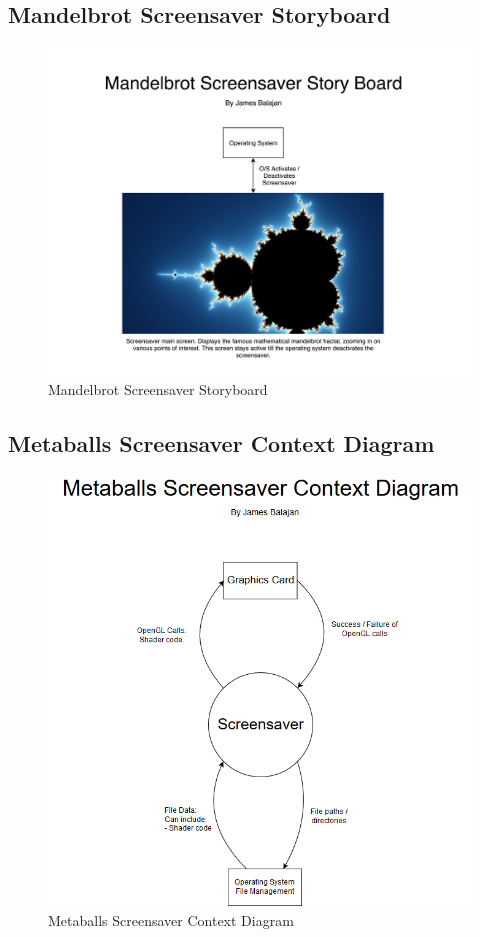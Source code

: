 \documentclass[10pt, openany]{book}
\begin{document}
\subsection{Mandelbrot Screensaver Storyboard}
\begin{figure}[H]
	\centering
	\includegraphics[width=1.0\linewidth]{Mandelbrot Screensaver Story Board}
	\caption{Mandelbrot Screensaver Storyboard}
	\label{app:mandelbrot-story}
\end{figure}
\newpage

\subsection{Metaballs Screensaver Context Diagram}
\begin{figure}[H]
	\centering
	\includegraphics[width=1.0\linewidth]{Metaballs Screensaver Context Diagram}
	\caption{Metaballs Screensaver Context Diagram}
	\label{app:metaballs-context}
\end{figure}
\newpage
\end{document}
